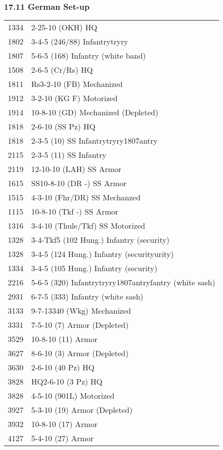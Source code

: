 \documentclass[10pt]{article}
\begin{document}
\newpage

\subsubsection*{17.11 German Set-up}


\begin{tabular}{ll}
1334 & 2-25-10 (OKH) HQ \\
1802 & 3-4-5 (246/88) Infantrytryry \\
1807 & 5-6-5 (168) Infantry (white band) \\
1508 &  2-6-5 (Cr/Rs) HQ \\
1811 & Rs3-2-10 (FB) Mechanized \\
1912 & 3-2-10 (KG F) Motorized \\
1914 & 10-8-10 (GD) Mechanized (Depleted) \\
1818 & 2-6-10 (SS Pz) HQ \\
1818 & 2-3-5 (10) SS Infantrytryry1807antry \\
2115 & 2-3-5 (11) SS Infantry \\
2119 & 12-10-10 (LAH) SS Armor \\
1615 & SS10-8-10 (DR -) SS Armor \\
1515 & 4-3-10 (Fhr/DR) SS Mechanzed \\
1115 & 10-8-10 (Tkf -) SS Armor \\
1316 & 3-4-10 (Thule/Tkf) SS Motorized \\
1328 & 3-4-Tkf5 (102 Hung.) Infantry (security) \\
1328 & 3-4-5 (124 Hung.) Infantry (securityurity) \\
1334 & 3-4-5 (105 Hung.) Infantry (security) \\
2216 & 5-6-5 (320) Infantrytryry1807antryfantry (white sash) \\
2931 & 6-7-5 (333) Infantry (white sash) \\
3133 & 9-7-13340 (Wkg) Mechanized \\
3331 & 7-5-10 (7) Armor (Depleted) \\
3529 & 10-8-10 (11) Armor \\
3627 & 8-6-10 (3) Armor (Depleted) \\
3630 & 2-6-10 (40 Pz) HQ \\
3828 & HQ2-6-10 (3 Pz) HQ \\
3828 & 4-5-10 (901L) Motorized \\
3927 & 5-3-10 (19) Armor (Depleted) \\
3932 & 10-8-10 (17) Armor \\
4127 & 5-4-10 (27) Armor \\
\end{tabular}
\end{document}
